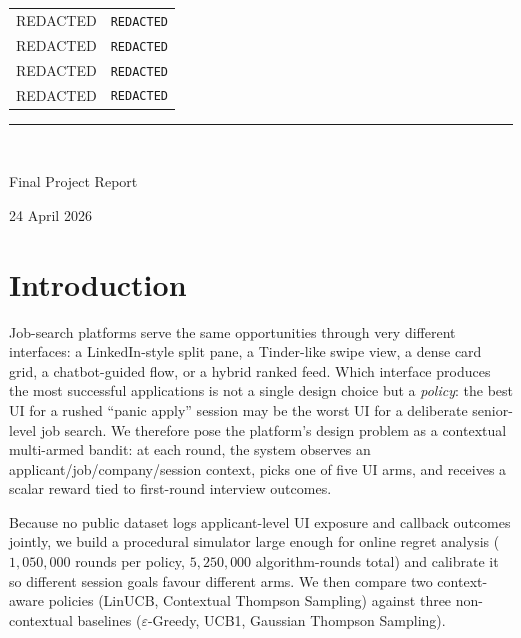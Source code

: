 \documentclass[11pt,a4paper]{article}
\begin{document}
\begin{titlepage}
{\large
\begin{tabular}{rl}
REDACTED             & \texttt{REDACTED} \\[0.15em]
REDACTED             & \texttt{REDACTED} \\[0.15em]
REDACTED             & \texttt{REDACTED} \\[0.15em]
REDACTED             & \texttt{REDACTED} \\
\end{tabular}
\par}

\vfill

{\color{accent}\rule{0.5\textwidth}{0.4pt}}\\[0.5em]
{\normalsize Final Project Report \par}
{\normalsize 24 April 2026 \par}
\vspace{0.5cm}

\end{titlepage}

\setcounter{page}{1}

\section{Introduction}

Job-search platforms serve the same opportunities through very different
interfaces: a LinkedIn-style split pane, a Tinder-like swipe view, a dense card
grid, a chatbot-guided flow, or a hybrid ranked feed. Which interface produces
the most successful applications is not a single design choice but a
\emph{policy}: the best UI for a rushed ``panic apply'' session may be the worst
UI for a deliberate senior-level job search. We therefore pose the platform's
design problem as a contextual multi-armed bandit: at each round, the system
observes an applicant/job/company/session context, picks one of five UI arms,
and receives a scalar reward tied to first-round interview outcomes.

Because no public dataset logs applicant-level UI exposure and callback outcomes
jointly, we build a procedural simulator large enough for online regret
analysis ($1{,}050{,}000$ rounds per policy, $5{,}250{,}000$ algorithm-rounds
total) and calibrate it so different session goals favour different arms. We
then compare two context-aware policies (LinUCB, Contextual Thompson Sampling)
against three non-contextual baselines ($\varepsilon$-Greedy, UCB1, Gaussian
Thompson Sampling).
\end{document}
